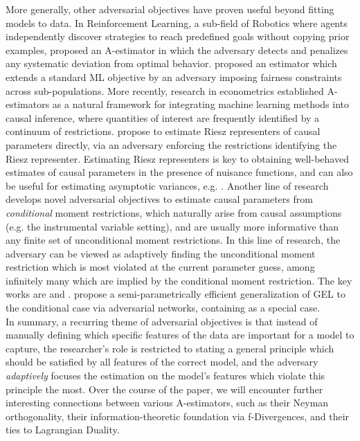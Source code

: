 \documentclass[12pt]{article}
\theoremstyle{myplain}
\theoremstyle{definition}
\theoremstyle{definition}
\theoremstyle{remark}
\numberwithin{equation}{section}
\begin{document}
More generally, other adversarial objectives have proven useful beyond fitting models to data. In Reinforcement Learning, a sub-field of Robotics where agents independently discover strategies to reach predefined goals without copying prior examples, \cite{sbeed} proposed an A-estimator in which the adversary detects and penalizes any systematic deviation from optimal behavior. \cite{constrainedOpt} proposed an estimator which extends a standard ML objective by an adversary imposing fairness constraints across sub-populations. More recently, research in econometrics established A-estimators as a natural framework for integrating machine learning methods into causal inference, where quantities of interest are frequently identified by a continuum of restrictions. \cite{chernozhukov2020adversarial} propose to estimate Riesz representers of causal parameters directly, via an adversary enforcing the restrictions identifying the Riesz representer. Estimating Riesz representers is key to obtaining well-behaved estimates of causal parameters in the presence of nuisance functions, and can also be useful for estimating asymptotic variances, e.g. \cite{penalizedsieve2019}. Another line of research develops novel adversarial objectives to estimate causal parameters from {\it conditional} moment restrictions, which naturally arise from causal assumptions (e.g. the instrumental variable setting), and are usually more informative than any finite set of unconditional moment restrictions. In this line of research, the adversary can be viewed as adaptively finding the unconditional moment restriction which is most violated at the current parameter guess, among infinitely many which are implied by the conditional moment restriction. The key works are \cite{adversarialGMM2018,dikkala2020minimax} and \cite{deepGMM2019, variationalMM2020}. \cite{metzger2021} propose a semi-parametrically efficient generalization of GEL to the conditional case via adversarial networks, containing \cite{variationalMM2020} as a special case. \\

In summary, a recurring theme of adversarial objectives is that instead of manually defining which specific features of the data are important for a model to capture, the researcher's role is restricted to stating a general principle which should be satisfied by all features of the correct model, and the adversary {\it adaptively} focuses the estimation on the model's features which violate this principle the most. Over the course of the paper, we will encounter further interesting connections between various A-estimators, such as their Neyman orthogonality, their information-theoretic foundation via f-Divergences, and their ties to Lagrangian Duality.\\
\end{document}
